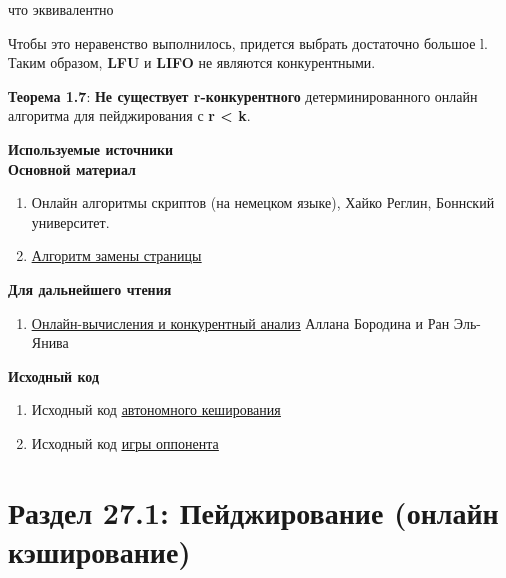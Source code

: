 \vspace{\baselineskip}

что эквивалентно

\vspace{\baselineskip}


\vspace{\baselineskip}

Чтобы это неравенство выполнилось, придется выбрать достаточно большое l. Таким образом, \textbf{LFU} и \textbf{LIFO} не являются конкурентными.

\vspace{\baselineskip}

\textbf{Теорема 1.7}: \textbf{Не существует r-конкурентного} детерминированного онлайн алгоритма для пейджирования с \textbf{r < k}.

\vspace{\baselineskip}

\textbf{Используемые источники} \\
\textbf{Основной материал}

\begin{enumerate}
    \item Онлайн алгоритмы скриптов (на немецком языке), Хайко Реглин, Боннский университет.
    \item \href{https://en.wikipedia.org/wiki/Page_replacement_algorithm}{\underline{Алгоритм замены страницы}}
\end{enumerate}

\textbf{Для дальнейшего чтения}

\begin{enumerate}
    \item \href{http://www.cs.technion.ac.il/~rani/book.html}{\underline{Онлайн-вычисления и конкурентный анализ}} Аллана Бородина и Ран Эль-Янива
\end{enumerate}

\textbf{Исходный код}

\begin{enumerate}
    \item Исходный код  \href{https://pastebin.com/AF7EC2xJ}{\underline{автономного кеширования}}
    \item Исходный код  \href{https://pastebin.com/u/kgoedde/1/Wak9refA}{\underline{игры оппонента}}
\end{enumerate}

\section*{Раздел 27.1: Пейджирование (онлайн кэширование)}

